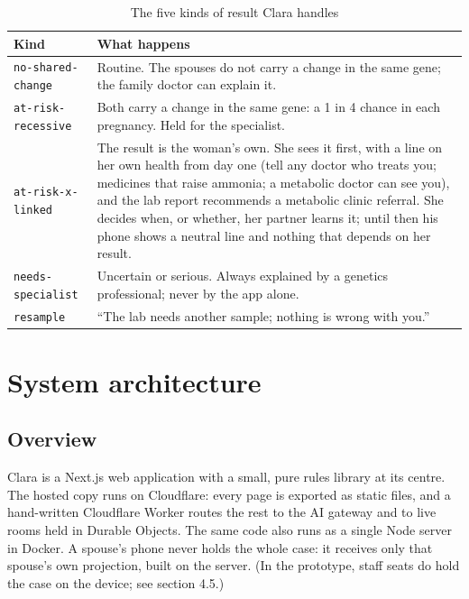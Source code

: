 \documentclass[10.5pt,a4paper]{article}
\newcommand{\chapterbreak}{}
\let\oldsection\section
\renewcommand{\section}{\chapterbreak\oldsection}
\newcommand{\thead}[1]{\textbf{#1}}
\newcommand{\toprl}{\arrayrulecolor{ink}\toprule\arrayrulecolor{rule}}
\newcommand{\code}[1]{\texttt{\small #1}}
\begin{document}
{\small
\begin{xltabular}{\textwidth}{@{}P{3.6cm}L@{}}
\caption{The five kinds of result Clara handles}\\
\toprl
\thead{Kind} & \thead{What happens}\\
\midrule
\code{no-shared-change} & Routine. The spouses do not carry a change in the same gene; the family doctor can explain it.\\
\midrule
\code{at-risk-recessive} & Both carry a change in the same gene: a 1 in 4 chance in each pregnancy. Held for the specialist.\\
\midrule
\code{at-risk-x-linked} & The result is the woman's own. She sees it first, with a line on her own health from day one (tell any doctor who treats you; medicines that raise ammonia; a metabolic doctor can see you), and the lab report recommends a metabolic clinic referral. She decides when, or whether, her partner learns it; until then his phone shows a neutral line and nothing that depends on her result.\\
\midrule
\code{needs-specialist} & Uncertain or serious. Always explained by a genetics professional; never by the app alone.\\
\midrule
\code{resample} & ``The lab needs another sample; nothing is wrong with you.''\\
\bottomrule
\end{xltabular}}

\section{System architecture}\label{sec:arch}

\subsection{Overview}

Clara is a Next.js web application with a small, pure rules library at its centre. The hosted copy runs on Cloudflare:
every page is exported as static files, and a hand-written Cloudflare Worker routes the rest to the AI gateway and to
live rooms held in Durable Objects. The same code also runs as a single Node server in Docker. A spouse's phone
never holds the whole case: it receives only that spouse's own projection, built on the server. (In the prototype,
staff seats do hold the case on the device; see section 4.5.)
\end{document}

